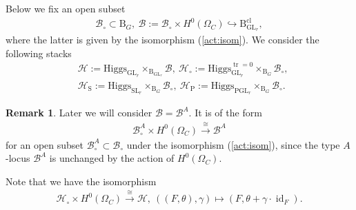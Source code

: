 \documentclass[11pt,oneside,a4paper,mathscr]{amsart}
\theoremstyle{definition}
\newtheorem{remark}[thm]{Remark}
\newcommand{\tr}{\operatorname{\mathrm{tr}}}
\newcommand{\cH}{\mathcal{H}}
\newcommand{\cB}{\mathcal{B}}
\newcommand{\rB}{\mathrm{B}}
\newcommand{\id}{\operatorname{id}}
\newcommand{\GL}{\operatorname{GL}}
\newcommand{\SL}{\operatorname{SL}}
\newcommand{\PGL}{\operatorname{PGL}}
\newcommand{\rS}{\mathrm{S}}
\newcommand{\Hig}{\mathrm{Higgs}}
\begin{document}
Below we fix an open subset 
\begin{align*}
    \cB_{\circ} \subset \rB_{G}, \ \cB:=\cB_{\circ} \times H^0(\Omega_C) \hookrightarrow \rB_{\GL_r}^{\mathrm{cl}},
\end{align*}
where the latter is given by the isomorphism (\ref{act:isom}). 
We consider the following stacks 
\begin{align*}
    &\cH:=\Hig_{\GL_r}\times_{\rB_{\GL_r}}\cB, \ 
    \cH_{\circ}:=\Hig_{\GL_r}^{\tr=0}\times_{\rB_{G}}\cB_{\circ}, \\
    &\cH_{\rS}:=\Hig_{\SL_r}\times_{\rB_{G}}\cB_{\circ}, \ 
    \cH_{\mathrm{P}}:=\Hig_{\PGL_r}\times_{\rB_{G}}\cB_{\circ}.
\end{align*}
\begin{remark}\label{rmk:Acirc}
Later we will consider $\cB=\cB^A$. It is of the form 
\begin{align}\label{BAcirc}
\cB_{\circ}^A \times H^0(\Omega_C) \stackrel{\cong}{\to} \cB^A
\end{align}
for an open subset $\cB_{\circ}^A \subset \cB_{\circ}$ under the isomorphism (\ref{act:isom}), 
    since the type $A$-locus $\cB^A$ is unchanged by the action of $H^0(\Omega_C)$.
\end{remark}



Note that we have the isomorphism 
\begin{align}\label{isom:tr}
    \cH_{\circ}\times H^0(\Omega_C) \stackrel{\cong}{\to} \cH, \ 
    ((F, \theta), \gamma) \mapsto (F, \theta+\gamma \cdot \id_F).
\end{align}
\end{document}
